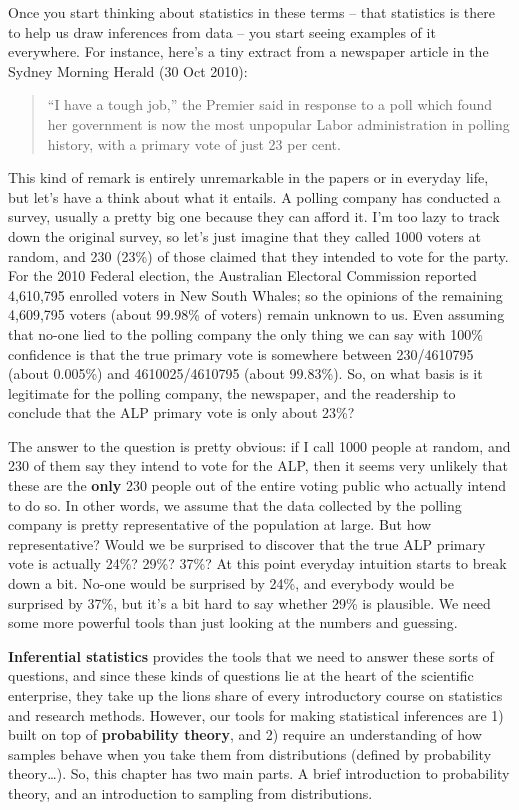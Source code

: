 \documentclass[
  letterpaper,
  DIV=11,
  numbers=noendperiod]{scrreprt}
\begin{document}
Once you start thinking about statistics in these terms -- that
statistics is there to help us draw inferences from data -- you start
seeing examples of it everywhere. For instance, here's a tiny extract
from a newspaper article in the Sydney Morning Herald (30 Oct 2010):

\begin{quote}
``I have a tough job,'' the Premier said in response to a poll which
found her government is now the most unpopular Labor administration in
polling history, with a primary vote of just 23 per cent.
\end{quote}

This kind of remark is entirely unremarkable in the papers or in
everyday life, but let's have a think about what it entails. A polling
company has conducted a survey, usually a pretty big one because they
can afford it. I'm too lazy to track down the original survey, so let's
just imagine that they called 1000 voters at random, and 230 (23\%) of
those claimed that they intended to vote for the party. For the 2010
Federal election, the Australian Electoral Commission reported 4,610,795
enrolled voters in New South Whales; so the opinions of the remaining
4,609,795 voters (about 99.98\% of voters) remain unknown to us. Even
assuming that no-one lied to the polling company the only thing we can
say with 100\% confidence is that the true primary vote is somewhere
between 230/4610795 (about 0.005\%) and 4610025/4610795 (about 99.83\%).
So, on what basis is it legitimate for the polling company, the
newspaper, and the readership to conclude that the ALP primary vote is
only about 23\%?

The answer to the question is pretty obvious: if I call 1000 people at
random, and 230 of them say they intend to vote for the ALP, then it
seems very unlikely that these are the \textbf{only} 230 people out of
the entire voting public who actually intend to do so. In other words,
we assume that the data collected by the polling company is pretty
representative of the population at large. But how representative? Would
we be surprised to discover that the true ALP primary vote is actually
24\%? 29\%? 37\%? At this point everyday intuition starts to break down
a bit. No-one would be surprised by 24\%, and everybody would be
surprised by 37\%, but it's a bit hard to say whether 29\% is plausible.
We need some more powerful tools than just looking at the numbers and
guessing.

\textbf{Inferential statistics} provides the tools that we need to
answer these sorts of questions, and since these kinds of questions lie
at the heart of the scientific enterprise, they take up the lions share
of every introductory course on statistics and research methods.
However, our tools for making statistical inferences are 1) built on top
of \textbf{probability theory}, and 2) require an understanding of how
samples behave when you take them from distributions (defined by
probability theory\ldots). So, this chapter has two main parts. A brief
introduction to probability theory, and an introduction to sampling from
distributions.
\end{document}

